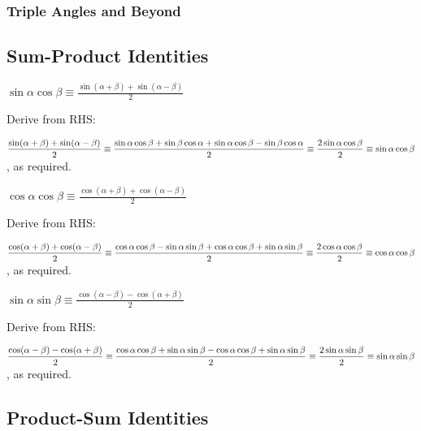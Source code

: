 \documentclass[a4paper,11pt]{article}
\begin{document}
    \subsubsection{Triple Angles and Beyond}

    \subsection{Sum-Product Identities} \label{sec:trig_sum_product}

    $\displaystyle \boxed{\sin \alpha \cos \beta \equiv
        \frac{\sin(\alpha + \beta) + \sin(\alpha - \beta)} 2}$

    Derive from RHS:

    $\displaystyle \frac{\sin(\alpha + \beta) + \sin(\alpha - \beta)} 2 \equiv
     \frac{\sin \alpha \cos \beta + \sin \beta \cos \alpha +
           \sin \alpha \cos \beta - \sin \beta \cos \alpha} 2 \\\\\equiv
     \frac{2 \sin \alpha \cos \beta} 2 \equiv \sin \alpha \cos \beta$,
    as required.

    $\displaystyle \boxed{\cos \alpha \cos \beta \equiv
     \frac{\cos(\alpha + \beta) + \cos(\alpha - \beta)} 2}$

    Derive from RHS:

    $\displaystyle \frac{\cos(\alpha + \beta) + \cos(\alpha - \beta)} 2 \equiv
     \frac{\cos \alpha \cos \beta - \sin \alpha \sin \beta +
           \cos \alpha \cos \beta + \sin \alpha \sin \beta} 2 \\\\\equiv
     \frac{2 \cos \alpha \cos \beta} 2 \equiv \cos \alpha \cos \beta$,
    as required.

    $\displaystyle \boxed{\sin \alpha \sin \beta \equiv
     \frac{\cos(\alpha - \beta) - \cos(\alpha + \beta)} 2}$

    Derive from RHS:

    $\displaystyle \frac{\cos(\alpha - \beta) - \cos(\alpha + \beta)} 2 \equiv
     \frac{\cos \alpha \cos \beta + \sin \alpha \sin \beta -
           \cos \alpha \cos \beta + \sin \alpha \sin \beta} 2 \\\\\equiv
     \frac{2 \sin \alpha \sin \beta} 2 \equiv \sin \alpha \sin \beta$,
    as required.

    \subsection{Product-Sum Identities}
\end{document}
